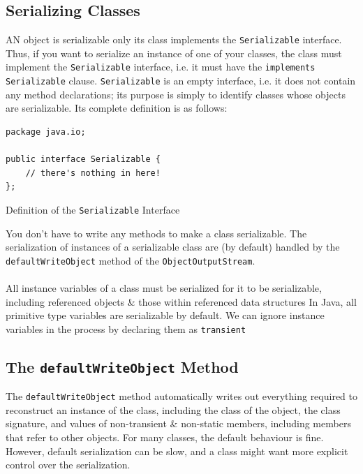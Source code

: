 \documentclass[a4paper,11pt]{article}
\newenvironment{code}{\captionsetup{type=listing}}{}
\begin{document}
\subsection{Serializing Classes}
AN object is serializable only its class implements the \verb|Serializable| interface. 
Thus, if you want to serialize an instance of one of your classes, the class must implement the 
\verb|Serializable| interface, i.e. it must have the \texttt{implements Serializable} clause. 
\verb|Serializable| is an empty interface, i.e. it does not contain any method declarations; its purpose is 
simply to identify classes whose objects are serializable.
Its complete definition is as follows:
\begin{code}
\begin{verbatim}
package java.io;

public interface Serializable {
    // there's nothing in here!
};
\end{verbatim}
\caption{Definition of the \texttt{Serializable} Interface}
\end{code}

You don't have to write any methods to make a class serializable.
The serialization of instances of a serializable class are (by default) handled by the \verb|defaultWriteObject| 
method of the \verb|ObjectOutputStream|.
\\\\
All instance variables of a class must be serialized for it to be serializable, including referenced objects 
\& those within referenced data structures
In Java, all primitive type variables are serializable by default.
We can ignore instance variables in the process by declaring them as \verb|transient|

\subsection{The \texttt{defaultWriteObject} Method}
The \verb|defaultWriteObject| method automatically writes out everything required to reconstruct an instance
of the class, including the class of the object, the class signature, and values of non-transient \& non-static
members, including members that refer to other objects.
For many classes, the default behaviour is fine. 
However, default serialization can be slow, and a class might want more explicit control over the serialization.
\end{document}
